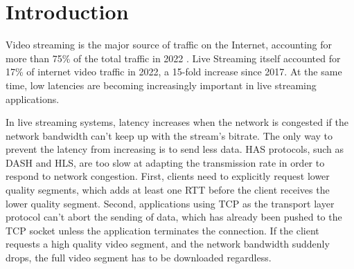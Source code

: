 
\chapter{Introduction}\label{chapter:introduction}

Video streaming is the major source of traffic on the Internet, accounting for more than 75\% of the total traffic in 2022 \parencite{ciscoCiscoVisualNetworking2018}. Live Streaming itself accounted for 17\% of internet video traffic in 2022, a 15-fold increase since 2017. At the same time, low latencies are becoming increasingly important in live streaming applications.

In live streaming systems, latency increases when the network is congested if the network bandwidth can't keep up with the stream's bitrate. The only way to prevent the latency from increasing is to send less data. \acf{HAS} protocols, 
such as \ac{DASH} and \ac{HLS}, are too slow at adapting the transmission rate in order to respond to network congestion. First, clients need to explicitly request lower quality segments, which adds at least one \ac{RTT} before the client receives the lower quality segment. Second, applications using TCP as the transport layer protocol can't abort the sending of data, which has already been pushed to the TCP socket unless the application terminates the connection. If the client requests a high quality video segment, and the network bandwidth suddenly drops, the full video segment has to be downloaded regardless. %


